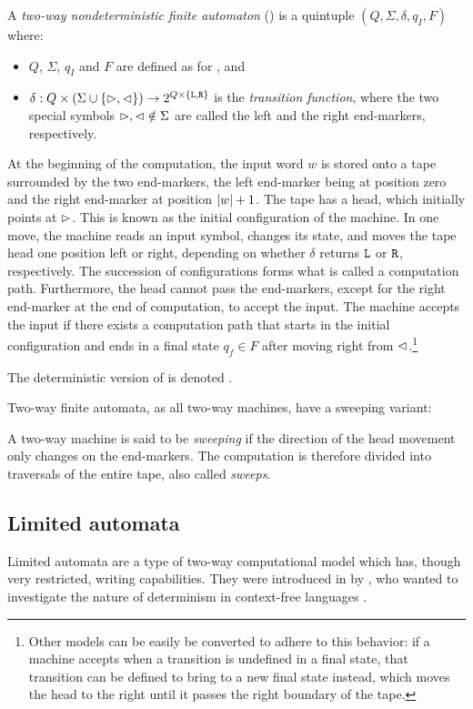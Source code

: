 \begin{defn}
	A \emph{two-way nondeterministic finite automaton} (\TNFA) is a quintuple $(Q,\Sigma,\delta,q_I,F)$ where:
	\begin{itemize}
		\item $Q$, $\Sigma$, $q_I$ and $F$ are defined as for \ONFAs, and
		\item $\delta:Q\times(\Sigma\cup\{\rhd,\lhd\})\to2^{Q\times\{\mathtt L,\mathtt R\}}$ is the \emph{transition function}, where the two special symbols $\rhd,\lhd\notin\Sigma$ are called the left and the right end-markers, respectively.
	\end{itemize}
	At the beginning of the computation, the input word $w$ is stored onto a tape surrounded by the two end-markers, the left end-marker being at position zero and the right end-marker at position $\lvert w \rvert+1$.
	The tape has a head, which initially points at $\rhd$.
	This is known as the initial configuration of the machine.
	In one move, the machine reads an input symbol, changes its state, and moves the tape head one position left or right, depending on whether $\delta$ returns $\mathtt L$ or $\mathtt R$, respectively.
	The succession of configurations forms what is called a computation path.
	Furthermore, the head cannot pass the end-markers, except for the right end-marker at the end of computation, to accept the input.
	The machine accepts the input if there exists a computation path that starts in the initial configuration and ends in a final state $q_f\in F$ after moving right from $\lhd$.\footnote{%
	Other models can be easily be converted to adhere to this behavior: if a machine accepts when a transition is undefined in a final state, that transition can be defined to bring to a new final state instead, which moves the head to the right until it passes the right boundary of the tape.}

	\noindent The deterministic version of \TNFAs is denoted \TDFAs.
\end{defn}

Two-way finite automata, as all two-way machines, have a sweeping variant:
\begin{defn}\label{def:sweeping}
	A two-way machine is said to be \emph{sweeping} if the direction of the head movement only changes on the end-markers.
	The computation is therefore divided into traversals of the entire tape, also called \emph{sweeps}.
\end{defn}


\subsection{Limited automata}
Limited automata are a type of two-way computational model which has, though very restricted, writing capabilities.
They were introduced in \citeyear{Hib67} by \citeauthor{Hib67}, who wanted to investigate the nature of determinism in context-free languages \cite{Hib67}.

